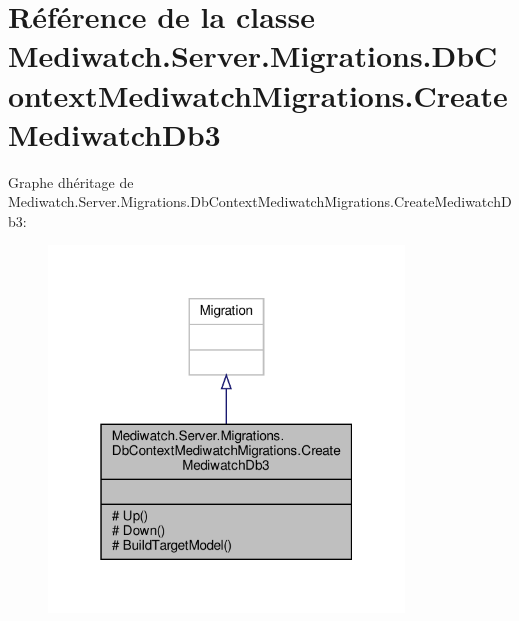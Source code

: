 \hypertarget{class_mediwatch_1_1_server_1_1_migrations_1_1_db_context_mediwatch_migrations_1_1_create_mediwatch_db3}{}\section{Référence de la classe Mediwatch.\+Server.\+Migrations.\+Db\+Context\+Mediwatch\+Migrations.\+Create\+Mediwatch\+Db3}
\label{class_mediwatch_1_1_server_1_1_migrations_1_1_db_context_mediwatch_migrations_1_1_create_mediwatch_db3}


Graphe d\textquotesingle{}héritage de Mediwatch.\+Server.\+Migrations.\+Db\+Context\+Mediwatch\+Migrations.\+Create\+Mediwatch\+Db3\+:\nopagebreak
\begin{figure}[H]
\begin{center}
\leavevmode
\includegraphics[width=268pt]{class_mediwatch_1_1_server_1_1_migrations_1_1_db_context_mediwatch_migrations_1_1_create_mediwatch_db3__inherit__graph}
\end{center}
\end{figure}


